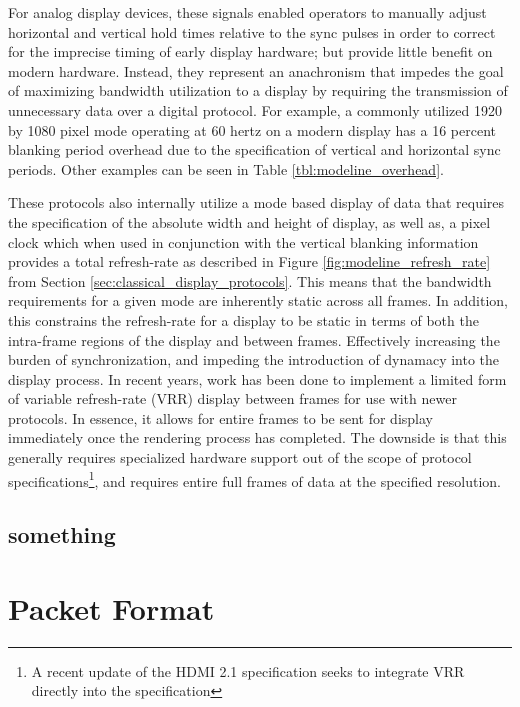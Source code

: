         For analog display devices, these signals enabled operators to manually adjust horizontal and vertical hold times relative to the sync pulses in order to correct for the imprecise timing of early display hardware; but provide little benefit on modern hardware. Instead, they represent an anachronism that impedes the goal of maximizing bandwidth utilization to a display by requiring the transmission of unnecessary data over a digital protocol. For example, a commonly utilized 1920 by 1080 pixel mode operating at 60 hertz\cite{MythTVWebsite} on a modern display has a 16 percent blanking period overhead due to the specification of vertical and horizontal sync periods. Other examples can be seen in Table \ref{tbl:modeline_overhead}.

        These protocols also internally utilize a mode based display of data that requires the specification of the absolute width and height of display, as well as, a pixel clock which when used in conjunction with the vertical blanking information provides a total refresh-rate as described in Figure \ref{fig:modeline_refresh_rate} from Section \ref{sec:classical_display_protocols}. This means that the bandwidth requirements for a given mode are inherently static across all frames. In addition, this constrains the refresh-rate for a display to be static in terms of both the intra-frame regions of the display and between frames. Effectively increasing the burden of synchronization, and impeding the introduction of dynamacy into the display process. In recent years, work has been done to implement a limited form of variable refresh-rate (VRR) display between frames for use with newer protocols\cite{AMDFreesync,NVIDIAGsync}. In essence, it allows for entire frames to be sent for display immediately once the rendering process has completed. The downside is that this generally requires specialized hardware support out of the scope of protocol specifications\footnote{A recent update of the HDMI 2.1 specification\cite{HDMIForum2018} seeks to integrate VRR directly into the specification}, and requires entire full frames of data at the specified resolution.

    \subsection{something}


\section{Packet Format}



